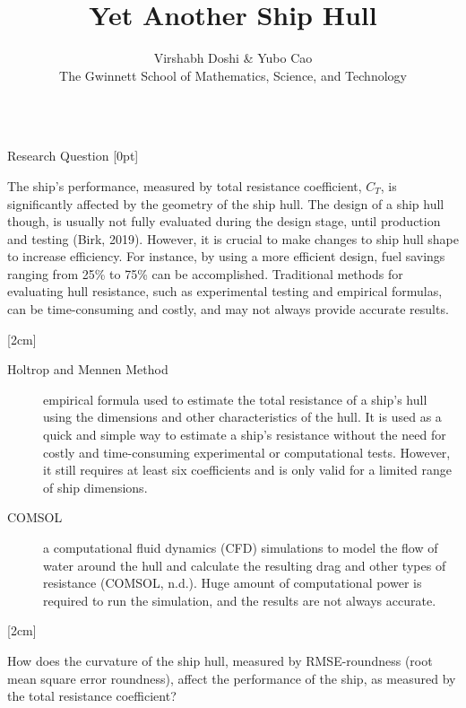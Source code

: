 \documentclass[final, 20pt]{beamer}
\title{Yet Another Ship Hull}
\author{Virshabh Doshi \& Yubo Cao\\\normalfont\selectfont The Gwinnett School of Mathematics, Science, and Technology}
\newlength{\colwidth}
\begin{document}
\begin{frame}[t]
  \centering
  \begin{columns}[t]
    \margincolumn

    \begin{column}{\colwidth}
      \begin{block}{Research Question}
        [0pt]

        The ship's performance, measured by total resistance coefficient, $C_T$, is significantly affected by the geometry of the ship hull. The design of a ship hull though, is usually not fully evaluated during the design stage, until production and testing (Birk, 2019). However, it is crucial to make changes to ship hull shape to increase efficiency. For instance, by using a more efficient design, fuel savings ranging from 25\% to 75\% can be accomplished. Traditional methods for evaluating hull resistance, such as experimental testing and empirical formulas, can be time-consuming and costly, and may not always provide accurate results.

        [2cm]

        \begin{description}
          \item[Holtrop and Mennen Method] empirical formula used to estimate the total resistance of a ship's hull using the dimensions and other characteristics of the hull. It is used as a quick and simple way to estimate a ship's resistance without the need for costly and time-consuming experimental or computational tests. However, it still requires at least six coefficients and is only valid for a limited range of ship dimensions.
          \item[COMSOL] a computational fluid dynamics (CFD) simulations to model the flow of water around the hull and calculate the resulting drag and other types of resistance (COMSOL, n.d.). Huge amount of computational power is required to run the simulation, and the results are not always accurate.
        \end{description}

        [2cm]

        How does the curvature of the ship hull, measured by RMSE-roundness (root mean square error roundness), affect the performance of the ship, as measured by the total resistance coefficient?
      \end{block}

      \vfill


\end{column}
\end{columns}
\end{frame}
\end{document}
